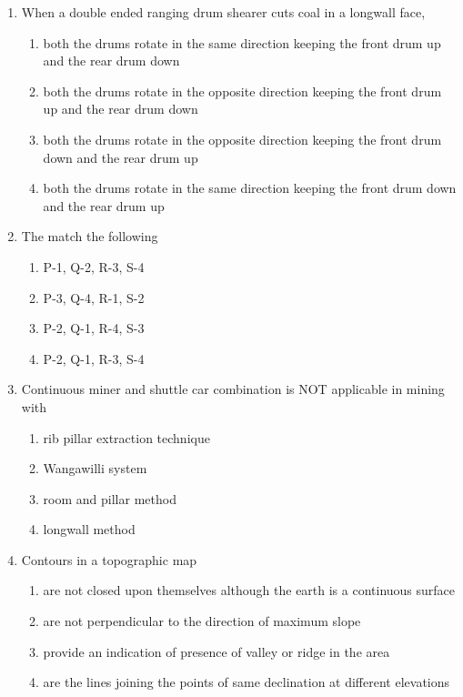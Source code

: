 \documentclass[journal]{IEEEtran}
\begin{document}
\begin{enumerate}[leftmargin=0pt]
\item When a double ended ranging drum shearer cuts coal in a longwall face,
\begin{enumerate}[label=(\Alph*), itemsep=3pt, topsep=2pt]
  \item both the drums rotate in the same direction keeping the front drum up and the rear drum down
  \item both the drums rotate in the opposite direction keeping the front drum up and the rear drum down
  \item both the drums rotate in the opposite direction keeping the front drum down and the rear drum up
  \item both the drums rotate in the same direction keeping the front drum down and the rear drum up
\end{enumerate}
\hfill{}
\item The match the following



\begin{multicols}{2}
\begin{enumerate}[label=(\Alph*)]
\item P-1, Q-2, R-3, S-4
\item P-3, Q-4, R-1, S-2
\item P-2, Q-1, R-4, S-3
\item P-2, Q-1, R-3, S-4
\end{enumerate}
\end{multicols}
\hfill{}

\item Continuous miner and shuttle car combination is NOT applicable in mining with
\begin{multicols}{2}
\begin{enumerate}[label=(\Alph*), itemsep=0pt, topsep=2pt]
  \item rib pillar extraction technique
  \item Wangawilli system
  \item room and pillar method
  \item longwall method
\end{enumerate}
\end{multicols}
\hfill{}

\item Contours in a topographic map
\begin{enumerate}[label=(\Alph*), itemsep=3pt, topsep=2pt]
  \item are not closed upon themselves although the earth is a continuous surface
  \item are not perpendicular to the direction of maximum slope
  \item provide an indication of presence of valley or ridge in the area
  \item are the lines joining the points of same declination at different elevations
\end{enumerate}
\hfill{}


\end{enumerate}
\end{document}
